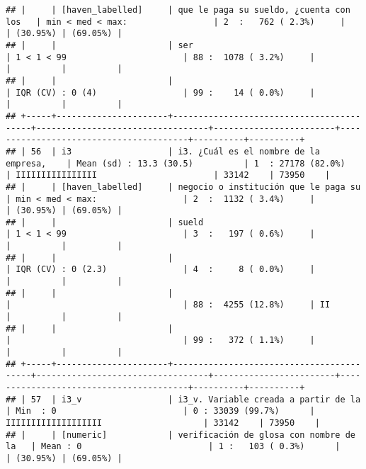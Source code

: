 \documentclass[]{article}
\begin{document}
\begin{verbatim}
## |     | [haven_labelled]     | que le paga su sueldo, ¿cuenta con los   | min < med < max:                 | 2  :   762 ( 2.3%)     |                                        | (30.95%) | (69.05%) |
## |     |                      | ser                                      | 1 < 1 < 99                       | 88 :  1078 ( 3.2%)     |                                        |          |          |
## |     |                      |                                          | IQR (CV) : 0 (4)                 | 99 :    14 ( 0.0%)     |                                        |          |          |
## +-----+----------------------+------------------------------------------+----------------------------------+------------------------+----------------------------------------+----------+----------+
## | 56  | i3                   | i3. ¿Cuál es el nombre de la empresa,    | Mean (sd) : 13.3 (30.5)          | 1  : 27178 (82.0%)     | IIIIIIIIIIIIIIII                       | 33142    | 73950    |
## |     | [haven_labelled]     | negocio o institución que le paga su     | min < med < max:                 | 2  :  1132 ( 3.4%)     |                                        | (30.95%) | (69.05%) |
## |     |                      | sueld                                    | 1 < 1 < 99                       | 3  :   197 ( 0.6%)     |                                        |          |          |
## |     |                      |                                          | IQR (CV) : 0 (2.3)               | 4  :     8 ( 0.0%)     |                                        |          |          |
## |     |                      |                                          |                                  | 88 :  4255 (12.8%)     | II                                     |          |          |
## |     |                      |                                          |                                  | 99 :   372 ( 1.1%)     |                                        |          |          |
## +-----+----------------------+------------------------------------------+----------------------------------+------------------------+----------------------------------------+----------+----------+
## | 57  | i3_v                 | i3_v. Variable creada a partir de la     | Min  : 0                         | 0 : 33039 (99.7%)      | IIIIIIIIIIIIIIIIIII                    | 33142    | 73950    |
## |     | [numeric]            | verificación de glosa con nombre de la   | Mean : 0                         | 1 :   103 ( 0.3%)      |                                        | (30.95%) | (69.05%) |

\end{verbatim}
\end{document}
